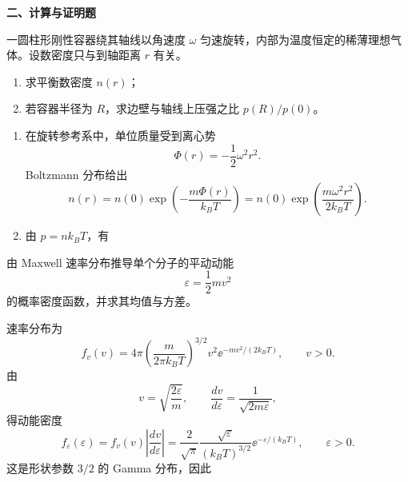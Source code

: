 \textbf{二、计算与证明题}
\begin{question}
一圆柱形刚性容器绕其轴线以角速度 $\omega$ 匀速旋转，内部为温度恒定的稀薄理想气体。设数密度只与到轴距离 $r$ 有关。
\begin{enumerate}[label=(\arabic*),leftmargin=2.8em,itemsep=0.2em]
\item 求平衡数密度 $n(r)$；
\item 若容器半径为 $R$，求边壁与轴线上压强之比 $p(R)/p(0)$。
\end{enumerate}
\begin{solution}

\begin{enumerate}[label=(\arabic*),leftmargin=2.8em,itemsep=0.2em]
\item 在旋转参考系中，单位质量受到离心势
\[
\Phi(r)=-\frac12\omega^2r^2.
\]
Boltzmann 分布给出
\[
n(r)=n(0)\exp\left(-\frac{m\Phi(r)}{k_BT}\right)
=n(0)\exp\left(\frac{m\omega^2r^2}{2k_BT}\right).
\]


\item 由 $p=nk_BT$，有
\end{enumerate}
\end{solution}
\end{question}

\begin{question}
由 Maxwell 速率分布推导单个分子的平动动能
\[
\varepsilon=\frac12 mv^2
\]
的概率密度函数，并求其均值与方差。
\begin{solution}

速率分布为
\[
f_v(v)=4\pi\left(\frac{m}{2\pi k_BT}\right)^{3/2}v^2\ee^{-mv^2/(2k_BT)},
\qquad v>0.
\]
由
\[
v=\sqrt{\frac{2\varepsilon}{m}},
\qquad \frac{dv}{d\varepsilon}=\frac{1}{\sqrt{2m\varepsilon}},
\]
得动能密度
\[
f_{\varepsilon}(\varepsilon)=f_v(v)\left|\frac{dv}{d\varepsilon}\right|
=\boxed{\frac{2}{\sqrt\pi}\frac{\sqrt\varepsilon}{(k_BT)^{3/2}}\ee^{-\varepsilon/(k_BT)}},
\qquad \varepsilon>0.
\]
这是形状参数 $3/2$ 的 Gamma 分布，因此
\end{solution}
\end{question}

